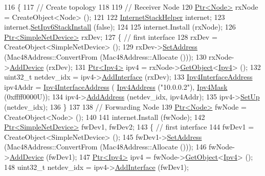 \begin{DoxyCode}
116 \{
117   \textcolor{comment}{// Create topology}
118 
119   \textcolor{comment}{// Receiver Node}
120   \hyperlink{classns3_1_1Ptr}{Ptr<Node>} rxNode = CreateObject<Node> ();
121 
122   \hyperlink{classns3_1_1InternetStackHelper}{InternetStackHelper} internet;
123   internet.\hyperlink{classns3_1_1InternetStackHelper_a5fa8d34e5834305b6aa1b0fe43e1132b}{SetIpv6StackInstall} (\textcolor{keyword}{false});
124 
125   internet.Install (rxNode);
126   \hyperlink{classns3_1_1Ptr}{Ptr<SimpleNetDevice>} rxDev;
127   \{ \textcolor{comment}{// first interface}
128     rxDev = CreateObject<SimpleNetDevice> ();
129     rxDev->\hyperlink{classns3_1_1SimpleNetDevice_a968ef3e7318bac29d5f1d7d977029af4}{SetAddress} (Mac48Address::ConvertFrom (Mac48Address::Allocate ()));
130     rxNode->\hyperlink{classns3_1_1Node_a42ff83ee1d5d1649c770d3f5b62375de}{AddDevice} (rxDev);
131     \hyperlink{classns3_1_1Ptr}{Ptr<Ipv4>} ipv4 = rxNode->\hyperlink{classns3_1_1Object_a13e18c00017096c8381eb651d5bd0783}{GetObject}<\hyperlink{classns3_1_1Ipv4}{Ipv4}> ();
132     uint32\_t netdev\_idx = ipv4->\hyperlink{classns3_1_1Ipv4_a637354128b71bc587ea5a6eeaef42469}{AddInterface} (rxDev);
133     \hyperlink{classns3_1_1Ipv4InterfaceAddress}{Ipv4InterfaceAddress} ipv4Addr = \hyperlink{classns3_1_1Ipv4InterfaceAddress}{Ipv4InterfaceAddress} (
      \hyperlink{classns3_1_1Ipv4Address}{Ipv4Address} (\textcolor{stringliteral}{"10.0.0.2"}), \hyperlink{classns3_1_1Ipv4Mask}{Ipv4Mask} (0xffff0000U));
134     ipv4->\hyperlink{classns3_1_1Ipv4_ad203526cae6a4b86f1bb89e44d2b62f7}{AddAddress} (netdev\_idx, ipv4Addr);
135     ipv4->\hyperlink{classns3_1_1Ipv4_a71b2f8acca4923aef907b50b3196bf23}{SetUp} (netdev\_idx);
136   \}
137 
138   \textcolor{comment}{// Forwarding Node}
139   \hyperlink{classns3_1_1Ptr}{Ptr<Node>} fwNode = CreateObject<Node> ();
140 
141   internet.Install (fwNode);
142   \hyperlink{classns3_1_1Ptr}{Ptr<SimpleNetDevice>} fwDev1, fwDev2;
143   \{ \textcolor{comment}{// first interface}
144     fwDev1 = CreateObject<SimpleNetDevice> ();
145     fwDev1->\hyperlink{classns3_1_1SimpleNetDevice_a968ef3e7318bac29d5f1d7d977029af4}{SetAddress} (Mac48Address::ConvertFrom (Mac48Address::Allocate ()));
146     fwNode->\hyperlink{classns3_1_1Node_a42ff83ee1d5d1649c770d3f5b62375de}{AddDevice} (fwDev1);
147     \hyperlink{classns3_1_1Ptr}{Ptr<Ipv4>} ipv4 = fwNode->\hyperlink{classns3_1_1Object_a13e18c00017096c8381eb651d5bd0783}{GetObject}<\hyperlink{classns3_1_1Ipv4}{Ipv4}> ();
148     uint32\_t netdev\_idx = ipv4->\hyperlink{classns3_1_1Ipv4_a637354128b71bc587ea5a6eeaef42469}{AddInterface} (fwDev1);

\end{DoxyCode}
